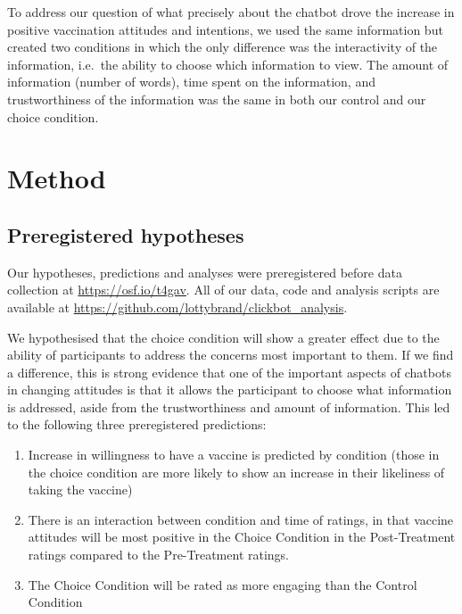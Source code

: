 \documentclass[
  english,
  ,jou,floatsintext]{apa6}
\providecommand{\tightlist}{%
  \setlength{\itemsep}{0pt}\setlength{\parskip}{0pt}}
\begin{document}
To address our question of what precisely about the chatbot drove the increase in positive vaccination attitudes and intentions, we used the same information but created two conditions in which the only difference was the interactivity of the information, i.e.~the ability to choose which information to view. The amount of information (number of words), time spent on the information, and trustworthiness of the information was the same in both our control and our choice condition.

\hypertarget{method}{%
\section{Method}\label{method}}

\hypertarget{preregistered-hypotheses}{%
\subsection{Preregistered hypotheses}\label{preregistered-hypotheses}}

Our hypotheses, predictions and analyses were preregistered before data collection at \url{https://osf.io/t4gav}. All of our data, code and analysis scripts are available at \url{https://github.com/lottybrand/clickbot_analysis}.

We hypothesised that the choice condition will show a greater effect due to the ability of participants to address the concerns most important to them. If we find a difference, this is strong evidence that one of the important aspects of chatbots in changing attitudes is that it allows the participant to choose what information is addressed, aside from the trustworthiness and amount of information. This led to the following three preregistered predictions:

\begin{enumerate}
\def\labelenumi{\arabic{enumi})}
\tightlist
\item
  Increase in willingness to have a vaccine is predicted by condition (those in the choice condition are more likely to show an increase in their likeliness of taking the vaccine)
\item
  There is an interaction between condition and time of ratings, in that vaccine attitudes will be most positive in the Choice Condition in the Post-Treatment ratings compared to the Pre-Treatment ratings.
\item
  The Choice Condition will be rated as more engaging than the Control Condition
\end{enumerate}
\end{document}
